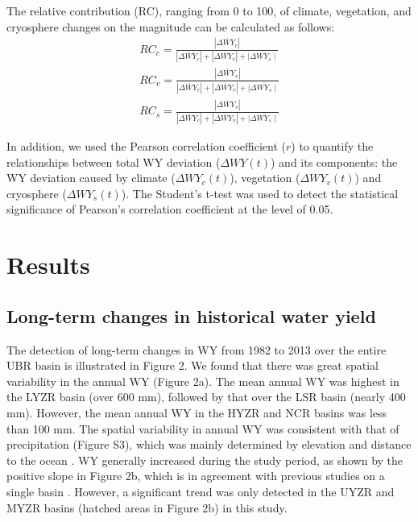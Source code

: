 \documentclass[hess, manuscript]{copernicus}
\begin{document}
The relative contribution (RC), ranging from 0 to 100, of climate, vegetation, and cryosphere changes on the magnitude can be calculated as follows:
\begin{equation}
    \begin{split}
    RC_{c}=\frac{\left|\overline{\Delta WY_{c}}\right|}{\left|\overline{\Delta WY_{c}}\right|+\left|\overline{\Delta WY_{v}}\right|+\mid \overline{\Delta WY_{s} \mid}}\\
    RC_{v}=\frac{\left|\overline{\Delta WY_{v}}\right|}{\left|\overline{\Delta WY_{c}}\right|+\left|\overline{\Delta WY_{v}}\right|+\mid \overline{\Delta WY_{s} \mid}}\\
    RC_{s}=\frac{\left|\overline{\Delta WY_{s}}\right|}{\left|\overline{\Delta WY_{c}}\right|+\left|\overline{\Delta WY_{v}}\right|+\mid \overline{\Delta WY_{s} \mid}}
    \end{split}
\end{equation}

In addition, we used the Pearson correlation coefficient ($r$) to quantify the relationships between total WY deviation ($\Delta WY(t)$) and its components: the WY deviation caused by climate ($\Delta WY_c(t)$), vegetation ($\Delta WY_v(t)$) and cryosphere ($\Delta WY_s(t)$). The Student's t-test was used to detect the statistical significance of Pearson's correlation coefficient at the level of 0.05.
    
\section{Results}
\subsection{Long-term changes in historical water yield}
The detection of long-term changes in WY from 1982 to 2013 over the entire UBR basin is illustrated in Figure 2. We found that there was great spatial variability in the annual WY (Figure 2a). The mean annual WY was highest in  the LYZR basin (over 600 mm), followed by that over the LSR basin (nearly 400 mm). However, the mean annual WY in the HYZR and NCR basins was less than 100 mm. The spatial variability in annual WY was consistent with that of precipitation (Figure S3), which was mainly determined by elevation and distance to the ocean \citep{sang2016precipitation}. WY generally increased during the study period, as shown by the positive slope in Figure 2b, which is in agreement with previous studies on a single basin \citep{li2021vegetation,linhess2020,zhangech2011}. However, a significant trend was only detected in the UYZR and MYZR basins (hatched areas in Figure 2b) in this study.
\end{document}
